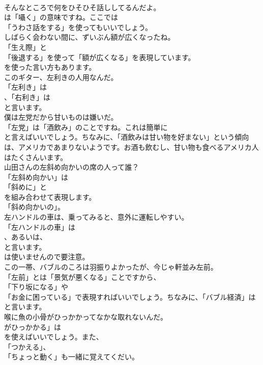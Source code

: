 \documentclass[8pt]{extreport}
\begin{document}
\begin{CJK}{UTF8}{min}
\\	そんなところで何をひそひそ話ししてるんだよ。 
\\	は「囁く」の意味ですね。ここでは
\\	「うわさ話をする」を使ってもいいでしょう。	
\\	しばらく会わない間に、ずいぶん額が広くなったね。 
\\	「生え際」と
\\	「後退する」を使って「額が広くなる」を表現しています。
\\	を使った言い方もあります。	
\\	このギター、左利きの人用なんだ。 
\\	「左利き」は
\\	、「右利き」は
\\	と言います。	
\\	僕は左党だから甘いものは嫌いだ。 
\\	「左党」は「酒飲み」のことですね。これは簡単に
\\	と言えばいいでしょう。ちなみに、「酒飲みは甘い物を好まない」という傾向は、アメリカであまりないようです。お酒も飲むし、甘い物も食べるアメリカ人はたくさんいます。	
\\	山田さんの左斜め向かいの席の人って誰？ 
\\	「左斜め向かい」は
\\	「斜めに」と
\\	を組み合わせて表現します。
\\	「斜め向かいの」。	
\\	左ハンドルの車は、乗ってみると、意外に運転しやすい。 
\\	「左ハンドルの車」は
\\	、あるいは、
\\	と言います。
\\	は使いませんので要注意。	
\\	この一帯、バブルのころは羽振りよかったが、今じゃ軒並み左前。 
\\	「左前」とは「景気が悪くなる」ことですから、
\\	「下り坂になる」や
\\	「お金に困っている」で表現すればいいでしょう。ちなみに、「バブル経済」は
\\	と言います。	
\\	喉に魚の小骨がひっかかってなかな取れないんだ。 
\\	がひっかかる」は
\\	を使えばいいでしょう。また、
\\	「つかえる」、
\\	「ちょっと動く」も一緒に覚えてくだい。	

\end{CJK}
\end{document}
